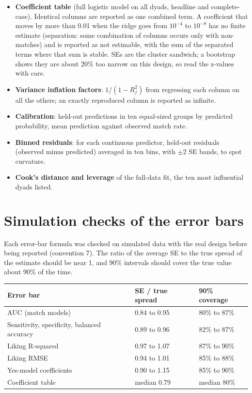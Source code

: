 \documentclass[11pt]{article}
\begin{document}
\begin{itemize}
\item \textbf{Coefficient table} (full logistic model on all dyads, headline and complete-case). Identical columns are
reported as one combined term. A coefficient that moves by more than 0.01 when the ridge goes from $10^{-4}$ to
$10^{-8}$ has no finite estimate (separation: some combination of columns occurs only with non-matches) and is reported
as not estimable, with the sum of the separated terms where that sum is stable. SEs are the cluster sandwich; a
bootstrap shows they are about 20\% too narrow on this design, so read the z-values with care.
\item \textbf{Variance inflation factors}: $1/(1 - R_j^2)$ from regressing each column on all the others; an exactly
reproduced column is reported as infinite.
\item \textbf{Calibration}: held-out predictions in ten equal-sized groups by predicted probability, mean prediction
against observed match rate.
\item \textbf{Binned residuals}: for each continuous predictor, held-out residuals (observed minus predicted) averaged
in ten bins, with $\pm 2$ SE bands, to spot curvature.
\item \textbf{Cook's distance and leverage} of the full-data fit, the ten most influential dyads listed.
\end{itemize}

\section{Simulation checks of the error bars}\label{sec:sims}

Each error-bar formula was checked on simulated data with the real design before being reported (convention 7). The ratio of the average SE to the true spread of the estimate should be near 1, and 90\% intervals should cover the true value about 90\% of the time.

\small
\begin{center}
\begin{tabular}{L{7cm}ll}
\toprule
\textbf{Error bar} & \textbf{SE / true spread} & \textbf{90\% coverage} \\
\midrule
AUC (match models) & 0.84 to 0.95 & 80\% to 87\% \\
Sensitivity, specificity, balanced accuracy & 0.89 to 0.96 & 82\% to 87\% \\
Liking R-squared & 0.97 to 1.07 & 87\% to 90\% \\
Liking RMSE & 0.94 to 1.01 & 85\% to 88\% \\
Yes-model coefficients & 0.90 to 1.15 & 85\% to 90\% \\
Coefficient table & median 0.79 & median 80\% \\
\bottomrule
\end{tabular}
\end{center}
\normalsize
\end{document}
